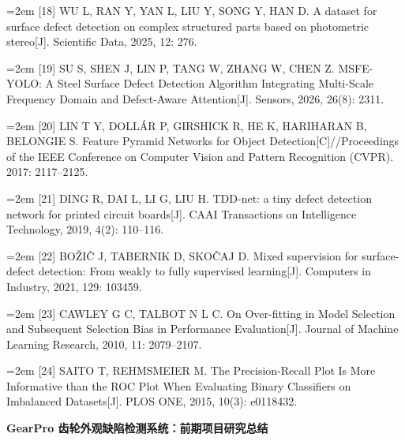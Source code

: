 {\small\noindent\hangindent=2em \hypertarget{ref:18}{}[18] WU L, RAN Y, YAN L, LIU Y, SONG Y, HAN D. A dataset for surface defect detection on complex structured parts based on photometric stereo[J]. Scientific Data, 2025, 12: 276.\par}

{\small\noindent\hangindent=2em \hypertarget{ref:19}{}[19] SU S, SHEN J, LIN P, TANG W, ZHANG W, CHEN Z. MSFE-YOLO: A Steel Surface Defect Detection Algorithm Integrating Multi-Scale Frequency Domain and Defect-Aware Attention[J]. Sensors, 2026, 26(8): 2311.\par}

{\small\noindent\hangindent=2em \hypertarget{ref:20}{}[20] LIN T Y, DOLLÁR P, GIRSHICK R, HE K, HARIHARAN B, BELONGIE S. Feature Pyramid Networks for Object Detection[C]//Proceedings of the IEEE Conference on Computer Vision and Pattern Recognition (CVPR). 2017: 2117–2125.\par}

{\small\noindent\hangindent=2em \hypertarget{ref:21}{}[21] DING R, DAI L, LI G, LIU H. TDD-net: a tiny defect detection network for printed circuit boards[J]. CAAI Transactions on Intelligence Technology, 2019, 4(2): 110–116.\par}

{\small\noindent\hangindent=2em \hypertarget{ref:22}{}[22] BOŽIČ J, TABERNIK D, SKOČAJ D. Mixed supervision for surface-defect detection: From weakly to fully supervised learning[J]. Computers in Industry, 2021, 129: 103459.\par}

{\small\noindent\hangindent=2em \hypertarget{ref:23}{}[23] CAWLEY G C, TALBOT N L C. On Over-fitting in Model Selection and Subsequent Selection Bias in Performance Evaluation[J]. Journal of Machine Learning Research, 2010, 11: 2079–2107.\par}

{\small\noindent\hangindent=2em \hypertarget{ref:24}{}[24] SAITO T, REHMSMEIER M. The Precision-Recall Plot Is More Informative than the ROC Plot When Evaluating Binary Classifiers on Imbalanced Datasets[J]. PLOS ONE, 2015, 10(3): e0118432.\par}
\endgroup


\newpage

\begin{center}
{\bfseries GearPro 齿轮外观缺陷检测系统：前期项目研究总结\par}
\end{center}

